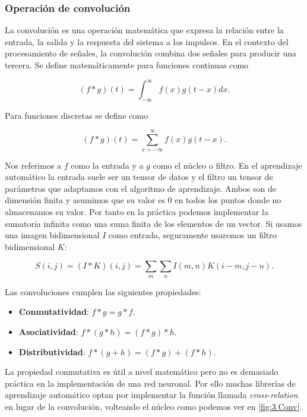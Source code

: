 \subsubsection{Operación de convolución}

La convolución es una operación matemática que expresa la relación entre la entrada, la salida y la respuesta del sistema a los impulsos. En el contexto del procesamiento de señales, la convolución combina dos señales para producir una tercera. Se define matemáticamente para funciones continuas como

$$ (f \ast g)(t) = \int_{-\infty}^{\infty} f(x)g(t-x)dx.$$

Para funciones discretas se define como

$$ (f \ast g)(t) = \sum_{x=-\infty}^{\infty} f(x)g(t-x).$$

Nos referimos a $f$ como la entrada y a $g$ como el núcleo o filtro. En el aprendizaje automático la entrada suele ser un tensor de datos y el filtro un tensor de parámetros que adaptamos con el algoritmo de aprendizaje. Ambos son de dimensión finita y asumimos que su valor es 0 en todos los puntos donde no almacenamos su valor. Por tanto en la práctica podemos implementar la sumatoria infinita como una suma finita de los elementos de un vector. Si usamos una imagen bidimensional $I$ como entrada, seguramente usaremos un filtro bidimensional $K$:

$$S(i,j) = (I \ast K)(i,j) = \sum_m \sum_n I(m,n)K(i-m,j-n).$$


Las convoluciones cumplen las siguientes propiedades:

\begin{itemize}

	\item \textbf{Conmutatividad}: $f \ast g = g \ast f$.
	
	\item \textbf{Asociatividad}: $f \ast (g \ast h ) = ( f \ast g) \ast h$.
	
	\item \textbf{Distributividad}: $f \ast (g + h) = (f \ast g) + (f \ast h)$.

\end{itemize}

La propiedad conmutativa es útil a nivel matemático pero no es demasiado práctica en la implementación de una red neuronal. Por ello muchas librerías de aprendizaje automático optan por implementar la función llamada \textit{cross-relation} en lugar de la convolución, volteando el núcleo como podemos ver en \ref{fig:3.Conv}.

